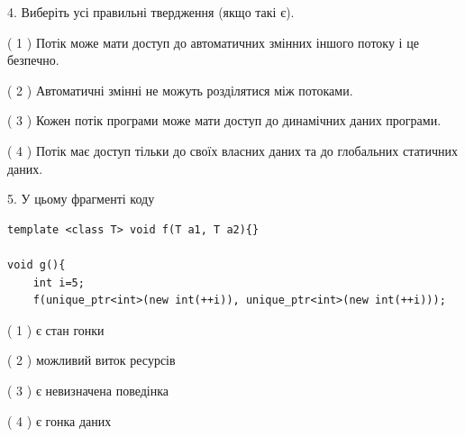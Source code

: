 \documentclass[12pt, ukrainian]{article}
\begin{document}
\begin {large}
{%
4. Виберіть усі правильні твердження (якщо такі є).\par
\vspace{2mm}

( 1 ) Потік може мати доступ до автоматичних змінних іншого потоку і це безпечно.%

( 2 ) Автоматичні змінні не можуть розділятися між потоками.%

( 3 ) Кожен потік програми може мати доступ до динамічних даних програми.%

( 4 ) Потік має доступ тільки до своїх власних даних та до глобальних статичних даних.%


5. У цьому фрагменті коду
\begin{verbatim}
template <class T> void f(T a1, T a2){}

void g(){
    int i=5;
    f(unique_ptr<int>(new int(++i)), unique_ptr<int>(new int(++i)));
\end{verbatim}

( 1 ) є стан гонки%

( 2 ) можливий виток ресурсів%

( 3 ) є невизначена поведінка%

( 4 ) є гонка даних%
}
\end {large}
\end{document}
